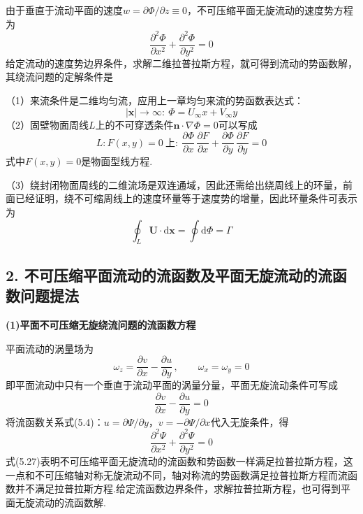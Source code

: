 由于垂直于流动平面的速度$w=\partial\Phi/\partial z\equiv 0$，不可压缩平面无旋流动的速度势方程为
\begin{equation*}
\frac{\partial^{2}\Phi}{\partial x^{2}}+\frac{\partial^{2}\Phi}{\partial y^{2}}=0
\tag{5.21}
\end{equation*}
给定流动的速度势边界条件，求解二维拉普拉斯方程，就可得到流动的势函数解，其绕流问题的定解条件是

（1）来流条件是二维均匀流，应用上一章均匀来流的势函数表达式：
\begin{equation*}
|\boldsymbol{x}|\to\infty:\ \Phi=U_\infty x+V_\infty y
\tag{5.22}
\end{equation*}
（2）固壁物面周线$L$上的不可穿透条件$\boldsymbol{n}\cdot\nabla\Phi=0$可以写成
\begin{equation*}
L:F(x,y)=0\ \text{上}:\ \frac{\partial\Phi}{\partial x}\,\frac{\partial F}{\partial x}+\frac{\partial\Phi}{\partial y}\,\frac{\partial F}{\partial y}=0
\tag{5.23}
\end{equation*}
式中$F(x,y)=0$是物面型线方程.

（3）绕封闭物面周线的二维流场是双连通域，因此还需给出绕周线上的环量，前面已经证明，绕不可缩周线上的速度环量等于速度势的增量，因此环量条件可表示为
\begin{equation*}
\oint_L\boldsymbol{U}\cdot\mathrm{d}\boldsymbol{x}=\oint\mathrm{d}\Phi=\Gamma
\tag{5.24}
\end{equation*}

\subsection*{2. 不可压缩平面流动的流函数及平面无旋流动的流函数问题提法}

\textbf{(1)平面不可压缩无旋绕流问题的流函数方程}

平面流动的涡量场为
\begin{equation*}
\omega_z=\frac{\partial v}{\partial x}-\frac{\partial u}{\partial y}\,,\qquad \omega_x=\omega_y=0
\tag{5.25}
\end{equation*}
即平面流动中只有一个垂直于流动平面的涡量分量，平面无旋流动条件可写成
\begin{equation*}
\frac{\partial v}{\partial x}-\frac{\partial u}{\partial y}=0
\tag{5.26}
\end{equation*}
将流函数关系式(5.4)：$u=\partial\Psi/\partial y$，$v=-\partial\Psi/\partial x$代入无旋条件，得
\begin{equation*}
\frac{\partial^{2}\Psi}{\partial x^{2}}+\frac{\partial^{2}\Psi}{\partial y^{2}}=0
\tag{5.27}
\end{equation*}
式(5.27)表明不可压缩平面无旋流动的流函数和势函数一样满足拉普拉斯方程，这一点和不可压缩轴对称无旋流动不同，轴对称流的势函数满足拉普拉斯方程而流函数并不满足拉普拉斯方程.给定流函数边界条件，求解拉普拉斯方程，也可得到平面无旋流动的流函数解.

